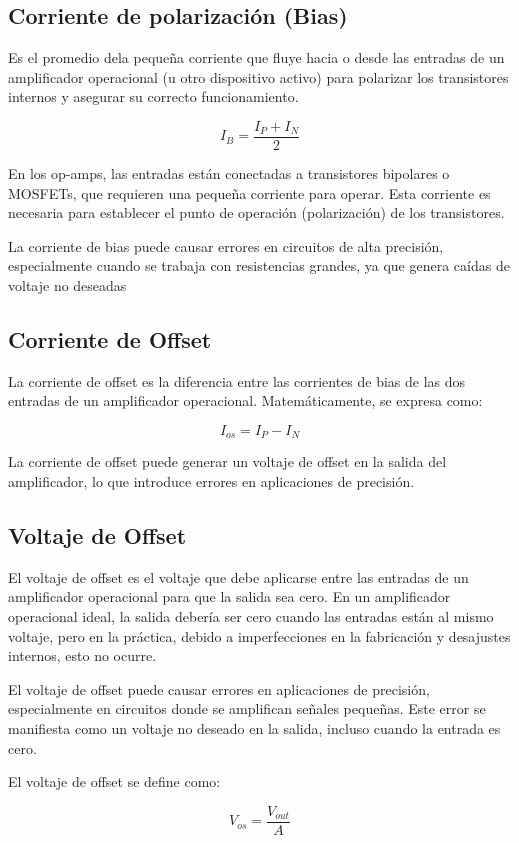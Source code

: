 \subsection{Corriente de polarización (Bias)}

Es el promedio dela pequeña corriente que fluye hacia o desde las entradas de un amplificador operacional (u otro dispositivo activo) para polarizar los transistores internos y asegurar su correcto funcionamiento.

\begin{equation}
    I_{B}=\frac{I_{P}+I_{N}}{2}
    \label{eq:corriente-polarizacion}
\end{equation}

En los op-amps, las entradas están conectadas a transistores bipolares o MOSFETs, que requieren una pequeña corriente para operar. Esta corriente es necesaria para establecer el punto de operación (polarización) de los transistores.

La corriente de bias puede causar errores en circuitos de alta precisión, especialmente cuando se trabaja con resistencias grandes, ya que genera caídas de voltaje no deseadas


\subsection{Corriente de Offset}

 La corriente de offset es la diferencia entre las corrientes de bias de las dos entradas de un amplificador operacional. Matemáticamente, se expresa como:

 \begin{equation}
    I_{os}=I_{P}-I_{N}
    \label{eq:corriente-offset}
 \end{equation}

 La corriente de offset puede generar un voltaje de offset en la salida del amplificador, lo que introduce errores en aplicaciones de precisión.

 \subsection{Voltaje de Offset}

 El voltaje de offset es el voltaje que debe aplicarse entre las entradas de un amplificador operacional para que la salida sea cero. En un amplificador operacional ideal, la salida debería ser cero cuando las entradas están al mismo voltaje, pero en la práctica, debido a imperfecciones en la fabricación y desajustes internos, esto no ocurre.

 El voltaje de offset puede causar errores en aplicaciones de precisión, especialmente en circuitos donde se amplifican señales pequeñas. Este error se manifiesta como un voltaje no deseado en la salida, incluso cuando la entrada es cero.

 El voltaje de offset se define como:

 \begin{equation}
    V_{os}=\frac{V_{out}}{A}
 \end{equation}